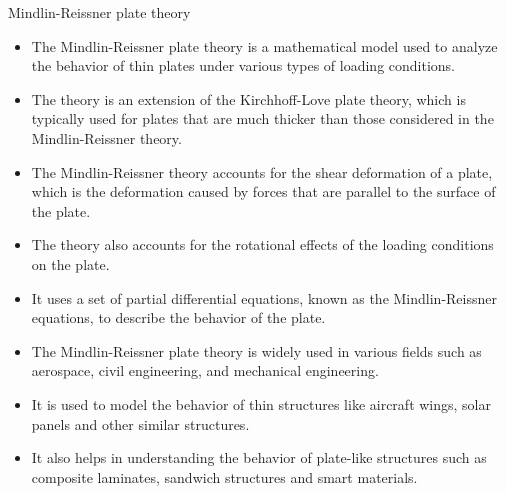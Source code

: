 \documentclass[10pt,aspectratio=169,dvipsnames]{beamer} %
\begin{document}
	\begin{frame}{Mindlin-Reissner plate theory}
		\begin{footnotesize}
			\begin{itemize}
				\item The Mindlin-Reissner plate theory is a mathematical model used to analyze the behavior of thin plates under various types of loading conditions. 
				\item The theory is an extension of the Kirchhoff-Love plate theory, which is typically used for plates that are much thicker than those considered in the Mindlin-Reissner theory.
				\item The Mindlin-Reissner theory accounts for the shear deformation of a plate, which is the deformation caused by forces that are parallel to the surface of the plate. 
				\item The theory also accounts for the rotational effects of the loading conditions on the plate. 
				\item It uses a set of partial differential equations, known as the Mindlin-Reissner equations, to describe the behavior of the plate.
				\item The Mindlin-Reissner plate theory is widely used in various fields such as aerospace, civil engineering, and mechanical engineering. 
				\item It is used to model the behavior of thin structures like aircraft wings, solar panels and other similar structures. 
				\item It also helps in understanding the behavior of plate-like structures such as composite laminates, sandwich structures and smart materials.
			\end{itemize}
		\end{footnotesize}		
	\end{frame}
\end{document}
